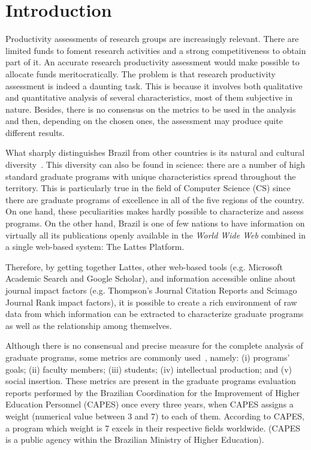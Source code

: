 \documentclass[10pt]{article}
\begin{document}

\section*{Introduction}\label{sec:intro}
Productivity assessments of research groups are increasingly relevant. There are limited funds to foment research
activities and a strong competitiveness to obtain part of it. An accurate research productivity assessment would
make possible 
to allocate funds meritocratically. The problem is that research productivity
assessment is indeed a daunting task. This is because it involves both
qualitative and quantitative analysis of several characteristics, most of them
subjective in nature. Besides, there is no consensus on the metrics to be used
in the analysis and then, depending on the chosen ones, the assessment may
produce quite different results. 

What sharply distinguishes Brazil from other countries is its natural and cultural diversity~\cite{enciclopedia-britanica}.
This diversity can also be found in science: there are a number of high standard graduate programs with unique
characteristics spread throughout the territory. This is particularly true in the field of Computer Science (CS) since there
are graduate programs of excellence in all of the five regions of the country.  On one hand, these peculiarities makes hardly
possible to characterize and assess programs. On the other hand, Brazil is one of few nations 
to have information on virtually all its publications openly available in the {\em World Wide Web} combined in a single web-based
system: The Lattes Platform.

Therefore, by getting together Lattes, other web-based
tools (e.g. Microsoft Academic Search and Google Scholar), and information accessible online about journal impact factors
(e.g.  Thompson's Journal Citation Reports and Scimago Journal Rank impact factors), it is possible to create a rich
environment of raw data from which information can be extracted to characterize graduate programs as well as the relationship
among themselves.

Although there is no consensual and precise measure for the complete analysis of graduate programs, some metrics are commonly
used~\cite{laender2008}, namely: (i) programs' goals; (ii) faculty members; (iii) students; (iv) intellectual production; and
(v) social insertion. These metrics are present in the graduate programs evaluation reports performed by the Brazilian
Coordination for the Improvement of Higher Education Personnel (CAPES) once every three years, when CAPES assigns a weight
(numerical value between 3 and 7) to each of them. 
According to CAPES, a program which weight is 7 excels in their respective fields worldwide. (CAPES is a public agency within the Brazilian Ministry of Higher
Education).
\end{document}

